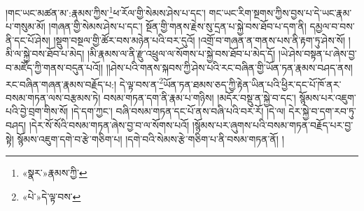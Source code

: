 །གང་ཡང་མཚན་མ་:རྣམས་ཀྱིས་\footnote{«སྣར་»རྣམས་ཀྱི་}ཕ་རོལ་གྱི་སེམས་ཤེས་པ་དང་། གང་ཡང་རིག་སྔགས་ཀྱིས་བྱས་པ་དེ་ཡང་རྣམ་པ་གསུམ་མོ། །གཞན་གྱི་སེམས་ཤེས་པ་དང་། སྔོན་གྱི་གནས་རྗེས་སུ་དྲན་པ་སྐྱེ་བས་ཐོབ་པ་དག་ནི། དམྱལ་བ་བས་ནི་དང་པོ་ཤེས། །སྡུག་བསྔལ་གྱི་ཚོར་བས་མཉེན་པའི་བར་དུའོ། །འགྲོ་བ་གཞན་ན་གནས་པས་ནི་རྟག་ཏུ་ཤེས་སོ། །མི་ལ་སྐྱེ་བས་ཐོབ་པ་མེད། །མི་རྣམས་ལ་ནི་རྫུ་འཕྲུལ་ལ་སོགས་པ་སྐྱེ་བས་ཐོབ་པ་མེད་དོ། །ཡེ་ཤེས་བསྟན་པ་ཞེས་བྱ་བ་མཛོད་ཀྱི་གནས་བདུན་པའོ།། །།ཤེས་པའི་གནས་སྐབས་ཀྱི་ཤེས་པའི་རང་བཞིན་གྱི་ཡོན་ཏན་རྣམས་བཤད་ནས། རང་བཞིན་གཞན་རྣམས་བརྗོད་པ:། དེ་ལྟ་བས་ན་\footnote{«པེ་»དེ་ལྟ་བས་}ཡོན་ཏན་ཐམས་ཅད་ཀྱི་རྟེན་ཡིན་པའི་ཕྱིར་དང་པོ་ཁོ་ནར་བསམ་གཏན་ལས་བརྩམས་ཏེ། བསམ་གཏན་དག་ནི་རྣམ་པ་གཉིས། །མདོར་བསྡུ་ན་སྐྱེ་བ་དང་། སྙོམས་པར་འཇུག་པའི་བྱེ་བྲག་གིས་སོ། །དེ་དག་ཀྱང་། བཞི་བསམ་གཏན་དང་པོ་ནས་བཞི་པའི་བར་རོ། །དེ་ལ། དེར་སྐྱེ་བ་དག་རབ་ཏུ་བཤད། །དེར་སོ་སོའི་བསམ་གཏན་ཞེས་བྱ་བ་ལ་སོགས་པའོ། །སྙོམས་པར་ཞུགས་པའི་བསམ་གཏན་བརྗོད་པར་བྱ་སྟེ། སྙོམས་འཇུག་དགེ་བ་རྩེ་གཅིག་པ། །དགེ་བའི་སེམས་རྩེ་གཅིག་པ་ནི་བསམ་གཏན་ནོ། །
